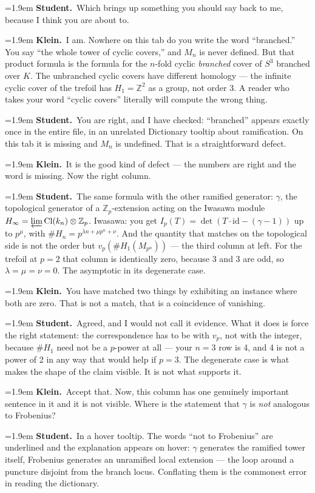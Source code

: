 \documentclass[11pt]{article}
\newcommand{\Stu}[1]{\par\smallskip\noindent\hangindent=1.9em\hangafter=1%
  \textcolor{stucol}{\textbf{Student.}}~#1\par}
\newcommand{\Kle}[1]{\par\smallskip\noindent\hangindent=1.9em\hangafter=1%
  \textcolor{klecol}{\textbf{Klein.}}~#1\par}
\begin{document}
\Stu{Which brings up something you should say back to me, because I think you are about to.}

\Kle{I am. Nowhere on this tab do you write the word ``branched.'' You say ``the whole tower of cyclic covers,'' and $M_n$ is never defined. But that product formula is the formula for the $n$-fold cyclic \emph{branched} cover of $S^3$ branched over $K$. The unbranched cyclic covers have different homology --- the infinite cyclic cover of the trefoil has $H_1 = \mathbb{Z}^2$ as a group, not order 3. A reader who takes your word ``cyclic covers'' literally will compute the wrong thing.}

\Stu{You are right, and I have checked: ``branched'' appears exactly once in the entire file, in an unrelated Dictionary tooltip about ramification. On this tab it is missing and $M_n$ is undefined. That is a straightforward defect.}

\Kle{It is the good kind of defect --- the numbers are right and the word is missing. Now the right column.}

\Stu{The same formula with the other ramified generator: $\gamma$, the topological generator of a $\mathbb{Z}_p$-extension acting on the Iwasawa module $H_\infty = \varprojlim \mathrm{Cl}(k_n) \otimes \mathbb{Z}_p$. Iwasawa: you get $I_p(T) = \det(T \cdot \mathrm{id} - (\gamma - 1))$ up to $p^\mu$, with $\#H_n = p^{\lambda n + \mu p^n + \nu}$. And the quantity that matches on the topological side is not the order but $v_p(\#H_1(M_{p^n}))$ --- the third column at left. For the trefoil at $p = 2$ that column is identically zero, because 3 and 3 are odd, so $\lambda = \mu = \nu = 0$. The asymptotic in its degenerate case.}

\Kle{You have matched two things by exhibiting an instance where both are zero. That is not a match, that is a coincidence of vanishing.}

\Stu{Agreed, and I would not call it evidence. What it does is force the right statement: the correspondence has to be with $v_p$, not with the integer, because $\#H_1$ need not be a $p$-power at all --- your $n = 3$ row is 4, and 4 is not a power of 2 in any way that would help if $p = 3$. The degenerate case is what makes the shape of the claim visible. It is not what supports it.}

\Kle{Accept that. Now, this column has one genuinely important sentence in it and it is not visible. Where is the statement that $\gamma$ is \emph{not} analogous to Frobenius?}

\Stu{In a hover tooltip. The words ``not to Frobenius'' are underlined and the explanation appears on hover: $\gamma$ generates the ramified tower itself, Frobenius generates an unramified local extension --- the loop around a puncture disjoint from the branch locus. Conflating them is the commonest error in reading the dictionary.}
\end{document}
